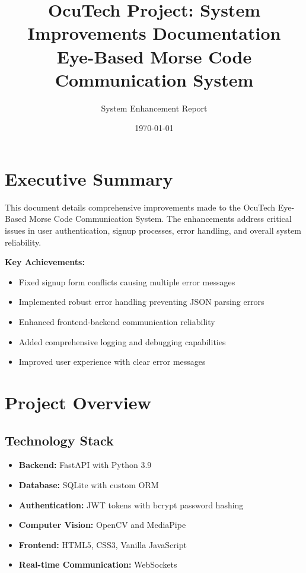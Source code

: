 \documentclass[12pt,a4paper]{article}
\begin{document}
\title{\textbf{OcuTech Project: System Improvements Documentation} \\ 
       \large Eye-Based Morse Code Communication System}
\author{System Enhancement Report}
\date{\today}

\maketitle

\tableofcontents
\newpage

\section{Executive Summary}

This document details comprehensive improvements made to the OcuTech Eye-Based Morse Code Communication System. The enhancements address critical issues in user authentication, signup processes, error handling, and overall system reliability.

\begin{tcolorbox}[colback=blue!5!white,colframe=blue!75!black]
\textbf{Key Achievements:}
\begin{itemize}
    \item Fixed signup form conflicts causing multiple error messages
    \item Implemented robust error handling preventing JSON parsing errors
    \item Enhanced frontend-backend communication reliability
    \item Added comprehensive logging and debugging capabilities
    \item Improved user experience with clear error messages
\end{itemize}
\end{tcolorbox}

\section{Project Overview}

\subsection{Technology Stack}
\begin{itemize}
    \item \textbf{Backend:} FastAPI with Python 3.9
    \item \textbf{Database:} SQLite with custom ORM
    \item \textbf{Authentication:} JWT tokens with bcrypt password hashing
    \item \textbf{Computer Vision:} OpenCV and MediaPipe
    \item \textbf{Frontend:} HTML5, CSS3, Vanilla JavaScript
    \item \textbf{Real-time Communication:} WebSockets
\end{itemize}
\end{document}
